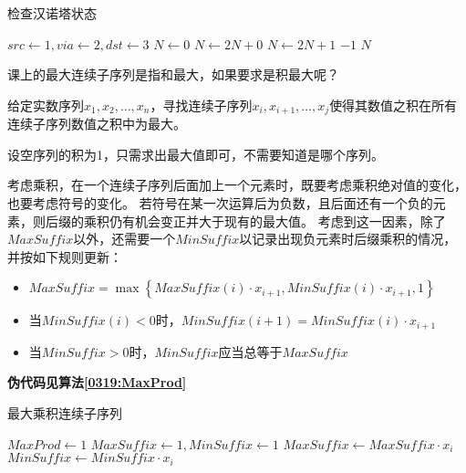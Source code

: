 \begin{questions}
    \begin{algorithm}[!htp]
        \caption{检查汉诺塔状态}\label{0316:CheckHanoi}
        \begin{algorithmic}[1]
            \State $src \gets 1, via \gets 2, dst \gets 3$
            \State $N \gets 0$
            \State $N \gets 2N + 0$
            \State {}
            \State $N \gets 2N + 1$
            \State {}
            \Else
            \State \Return $-1$
            \EndIf
            \EndFor
            \State \Return $N$
        \end{algorithmic}
    \end{algorithm}

    \question 课上的最大连续子序列是指和最大，如果要求是积最大呢？

    {\kaishu
    给定实数序列$x_1, x_2, \dots, x_n$，寻找连续子序列$x_i, x_{i+1}, \dots, x_j$使得其数值之积在所有连续子序列数值之积中为最大。

    设空序列的积为1，只需求出最大值即可，不需要知道是哪个序列。
    }

    \begin{solution}
        考虑乘积，在一个连续子序列后面加上一个元素时，既要考虑乘积绝对值的变化，也要考虑符号的变化。
        若符号在某一次运算后为负数，且后面还有一个负的元素，则后缀的乘积仍有机会变正并大于现有的最大值。
        考虑到这一因素，除了$MaxSuffix$以外，还需要一个$MinSuffix$以记录出现负元素时后缀乘积的情况，并按如下规则更新：
        \begin{itemize}
            \item $MaxSuffix = \max{\left\{MaxSuffix(i) \cdot x_{i+1}, MinSuffix(i) \cdot x_{i+1}, 1\right\}}$
            \item 当$MinSuffix(i) < 0$时，$MinSuffix(i+1) = MinSuffix(i) \cdot x_{i+1}$
            \item 当$MinSuffix > 0$时，$MinSuffix$应当总等于$MaxSuffix$
        \end{itemize}

        \textbf{伪代码见算法\ref{0319:MaxProd}}
    \end{solution}

    \begin{algorithm}[!htp]
        \caption{最大乘积连续子序列}\label{0319:MaxProd}
        \begin{algorithmic}[1]
            \State $MaxProd \gets 1$ 
            \State $MaxSuffix \gets 1, MinSuffix \gets 1$ 
            \State $MaxSuffix \gets MaxSuffix \cdot x_i$
            \State $MinSuffix \gets MinSuffix \cdot x_i$


\end{algorithmic}
\end{algorithm}
\end{questions}
